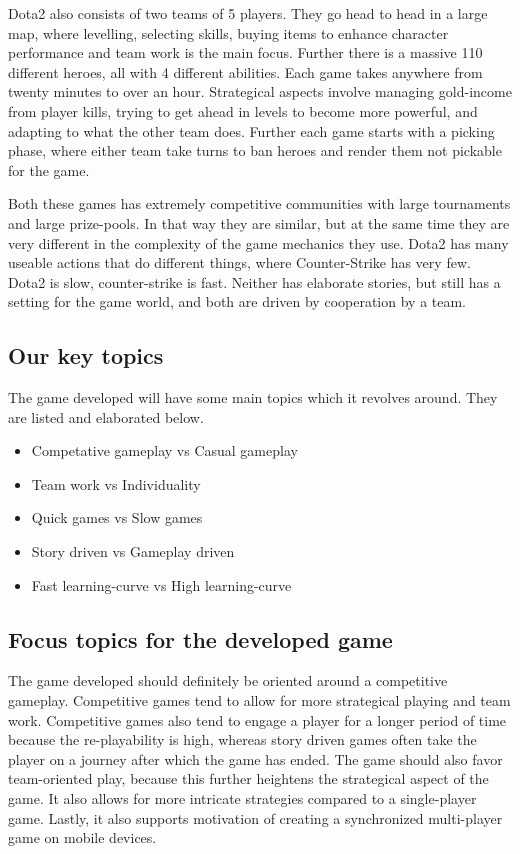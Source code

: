 Dota2 also consists of two teams of 5 players. They go head to head in a large map, where levelling, selecting skills, buying items to enhance character performance and team work is the main focus. Further there is a massive 110 different heroes, all with 4 different abilities. Each game takes anywhere from twenty minutes to over an hour. 
Strategical aspects involve managing gold-income from player kills, trying to get ahead in levels to become more powerful, and adapting to what the other team does. Further each game starts with a picking phase, where either team take turns to ban heroes and render them not pickable for the game.     

Both these games has extremely competitive communities with large tournaments and large prize-pools. In that way they are similar, but at the same time they are very different in the complexity of the game mechanics they use. Dota2 has many useable actions that do different things, where Counter-Strike has very few. Dota2 is slow, counter-strike is fast. Neither has elaborate stories, but still has a setting for the game world, and both are driven by cooperation by a team.

\subsection{Our key topics}
The game developed will have some main topics which it revolves around. They are listed and elaborated below.

\begin{itemize}
\item Competative gameplay vs Casual gameplay
\item Team work vs Individuality
\item Quick games vs Slow games
\item Story driven vs Gameplay driven
\item Fast learning-curve vs High learning-curve
\end{itemize}  

\subsection*{Focus topics for the developed game}
The game developed should definitely be oriented around a competitive gameplay. Competitive games tend to allow for more strategical playing and team work. Competitive games also tend to engage a player for a longer period of time because the re-playability is high, whereas story driven games often take the player on a journey after which the game has ended. The game should also favor team-oriented play, because this further heightens the strategical aspect of the game.
It also allows for more intricate strategies compared to a single-player game. Lastly, it also supports motivation of creating a synchronized multi-player game on mobile devices. 


